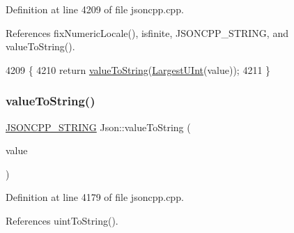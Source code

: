 Definition at line 4209 of file jsoncpp.\+cpp.



References fix\+Numeric\+Locale(), isfinite, J\+S\+O\+N\+C\+P\+P\+\_\+\+S\+T\+R\+I\+NG, and value\+To\+String().


\begin{DoxyCode}
4209                                          \{
4210   \textcolor{keywordflow}{return} \hyperlink{namespace_json_a498503e8f49d6a3811e3c9f6757da60d}{valueToString}(\hyperlink{namespace_json_ae202ecad69725e23443f465e257456d0}{LargestUInt}(value));
4211 \}
\end{DoxyCode}
\mbox{\label{namespace_json_a4732517cb28d203cfd4354d05952a81b}} 
\subsubsection{\texorpdfstring{value\+To\+String()}{valueToString()}\hspace{0.1cm}{\footnotesize\ttfamily [3/6]}}
{\footnotesize\ttfamily \hyperlink{json_8h_a1e723f95759de062585bc4a8fd3fa4be}{J\+S\+O\+N\+C\+P\+P\+\_\+\+S\+T\+R\+I\+NG} Json\+::value\+To\+String (\begin{DoxyParamCaption}\item[{\hyperlink{namespace_json_a218d880af853ce786cd985e82571d297}{Largest\+Int}}]{value }\end{DoxyParamCaption})}



Definition at line 4179 of file jsoncpp.\+cpp.



References uint\+To\+String().


